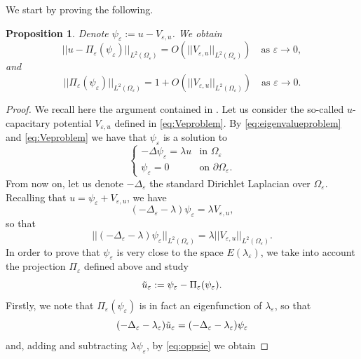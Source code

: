 \documentclass[11pt,reqno]{article}
\newtheorem{prop}[teo]{Proposition}
\numberwithin{equation}{section}
\newcommand\e\varepsilon
\newcommand{\Lau}{\color{magenta}}
\newcommand{\Ying}{\color{red}}
\begin{document}
We start by proving the following.
	\begin{prop}\label{p:main}
	Denote $\psi_\e:=u-V_{\e,u}$.	We obtain  
\begin{equation}\label{est1}
	|| u-\Pi_\e(\psi_\e) ||_{L^2(\Omega_\e)}=O(|| V_{\e,u} ||_{L^2(\Omega_\e)}) \quad \text{as }\e\to0,
\end{equation}
and
\begin{equation}\label{eq:normL2pepsie}
||\Pi_\e(\psi_\e)||_{L^2(\Omega_\e)} = 1 +O(|| V_{\e,u} ||_{L^2(\Omega_\e)}) \quad \text{as }\e\to0.
\end{equation}
\end{prop}
\begin{proof}
		We recall here the argument contained in \cite{afhl}.
		Let us consider the so-called $u$-capacitary potential $V_{\e,u}$ defined in \eqref{eq:Veproblem}. By \eqref{eq:eigenvalueproblem}
		and \eqref{eq:Veproblem} we have that $\psi_\e$ is a solution to 
		\begin{equation*}
			\begin{cases}
				-\Delta \psi_\e= \lambda u &\text{in }\Omega_\e\\
				\psi_\e=0 &\text{on }\partial \Omega_\e.
			\end{cases}
		\end{equation*}
		From now on, let us denote $-\Delta_\e$ the standard Dirichlet Laplacian over $\Omega_\e$. Recalling that $u=\psi_\e + V_{\e,u}$, we have
		\[
		(-\Delta_\e - \lambda)\psi_\e = \lambda V_{\e,u}, 
		\]
		so that 
		\begin{equation}\label{eq:oppsie}
			|| (-\Delta_\e - \lambda)\psi_\e ||_{L^2(\Omega_\e)} = 
			\lambda||  V_{\e,u} ||_{L^2(\Omega_\e)} .
		\end{equation}
		In order to prove that $\psi_\e$ is very close to the space $E(\lambda_\e)$, we take into account the projection $\Pi_\e$ defined above and study 
		\[
		\Tilde{u}_\e:= \psi_\e - \Pi_\e(\psi_\e).
		\]
		Firstly, we note that $ \Pi_\e(\psi_\e)$ is in fact an eigenfunction of $\lambda_\e$, so that 
		\[
		(-\Delta_\e - \lambda_\e) \Tilde{u}_\e = (-\Delta_\e - \lambda_\e) \psi_\e
		\]
		and, adding and subtracting $\lambda\psi_\e$, by \eqref{eq:oppsie} we obtain 

\end{proof}
\end{document}
